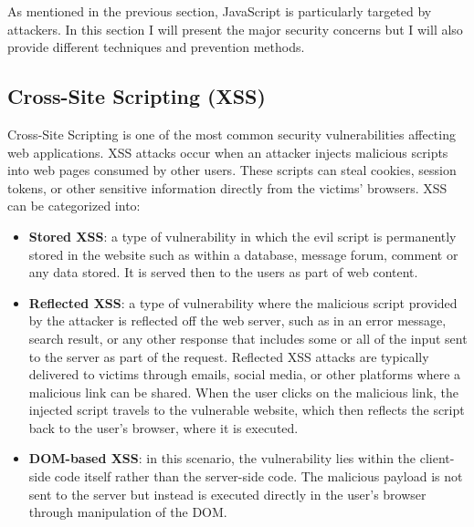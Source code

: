 \documentclass{article}
\begin{document}
As mentioned in the previous section, JavaScript is particularly targeted by attackers. In this section I will present the major security concerns but I will also provide different techniques and prevention methods.

\subsection{Cross-Site Scripting (XSS)}
Cross-Site Scripting is one of the most common security vulnerabilities affecting web applications. XSS attacks occur when an attacker injects malicious scripts into web pages consumed by other users. These scripts can steal cookies, session tokens, or other sensitive information directly from the victims' browsers. XSS can be categorized into:

\begin{itemize}
	\item \textbf{Stored XSS}: a type of vulnerability in which the evil script is permanently stored in the website such as within a database, message forum, comment or any data stored. It is served then to the users as part of web content.
	\item \textbf{Reflected XSS}: a type of vulnerability where the malicious script provided by the attacker is reflected off the web server, such as in an error message, search result, or any other response that includes some or all of the input sent to the server as part of the request. Reflected XSS attacks are typically delivered to victims through emails, social media, or other platforms where a malicious link can be shared. When the user clicks on the malicious link, the injected script travels to the vulnerable website, which then reflects the script back to the user's browser, where it is executed.
	\item \textbf{DOM-based XSS}: in this scenario, the vulnerability lies within the client-side code itself rather than the server-side code. The malicious payload is not sent to the server but instead is executed directly in the user's browser through manipulation of the DOM.
\end{itemize}
\end{document}
